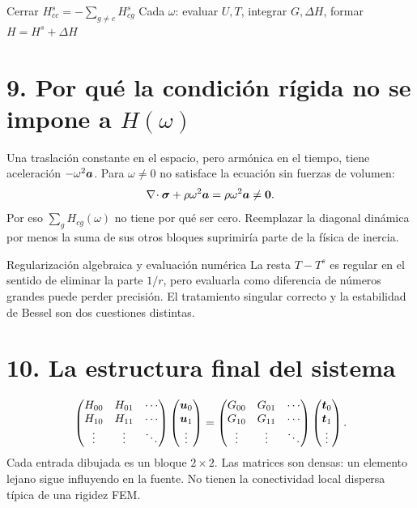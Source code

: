 \documentclass[11pt]{article}
\begin{document}
{Cerrar \(H^s_{cc}=-\sum_{g\ne c}H^s_{cg}\)}
{Cada \(\omega\): evaluar \(U,T\), integrar \(G,\Delta H\), formar \(H=H^s+\Delta H\)}

\section*{9. Por qué la condición rígida no se impone a \(H(\omega)\)}
Una traslación constante en el espacio, pero armónica en el tiempo, tiene
aceleración \(-\omega^2\bm{a}\). Para \(\omega\ne0\) no satisface la ecuación
sin fuerzas de volumen:
\[
 \nabla\!\cdot\boldsymbol\sigma+\rho\omega^2\bm{a}
 =\rho\omega^2\bm{a}\ne\bm{0}.
\]
Por eso \(\sum_gH_{cg}(\omega)\) no tiene por qué ser cero.
Reemplazar la diagonal dinámica por menos la suma de sus otros bloques
suprimiría parte de la física de inercia.

\begin{alerta}{Regularización algebraica y evaluación numérica}
La resta \(T-T^s\) es regular en el sentido de eliminar la parte \(1/r\),
pero evaluarla como diferencia de números grandes puede perder precisión.
El tratamiento singular correcto y la estabilidad de Bessel son dos
cuestiones distintas.
\end{alerta}

\newpage
\section*{10. La estructura final del sistema}
\[
 \begin{pmatrix}
 H_{00}&H_{01}&\cdots\\
 H_{10}&H_{11}&\cdots\\
 \vdots&\vdots&\ddots
 \end{pmatrix}
 \begin{pmatrix}\bm{u}_0\\\bm{u}_1\\\vdots\end{pmatrix}
 =
 \begin{pmatrix}
 G_{00}&G_{01}&\cdots\\
 G_{10}&G_{11}&\cdots\\
 \vdots&\vdots&\ddots
 \end{pmatrix}
 \begin{pmatrix}\bm{t}_0\\\bm{t}_1\\\vdots\end{pmatrix}.
\]
Cada entrada dibujada es un bloque \(2\times2\).
Las matrices son densas: un elemento lejano sigue influyendo en la fuente.
No tienen la conectividad local dispersa típica de una rigidez FEM.
\end{document}
